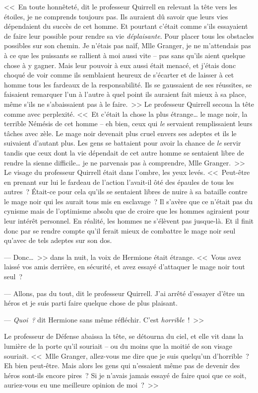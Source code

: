 <<~En toute honnêteté, dit le professeur Quirrell en relevant la tête vers les étoiles, je ne comprends toujours pas. Ils auraient dû savoir que leurs vies dépendaient du succès de cet homme. Et pourtant c'était comme s'ils essayaient de faire leur possible pour rendre sa vie \emph{déplaisante}. Pour placer tous les obstacles possibles sur son chemin. Je n'étais pas naïf, Mlle Granger, je ne m'attendais pas à ce que les puissants se rallient à moi aussi vite -- pas sans qu'ils aient quelque chose à y gagner. Mais leur pouvoir à eux aussi était menacé, et j'étais donc choqué de voir comme ils semblaient heureux de s'écarter et de laisser à cet homme tous les fardeaux de la responsabilité. Ils se gaussaient de ses réussites, se faisaient remarquer l'un à l'autre à quel point ils auraient fait mieux à sa place, même s'ils ne s'abaissaient pas à le faire.~>> Le professeur Quirrell secoua la tête comme avec perplexité. <<~Et c'était la chose la plus étrange… le mage noir, la terrible Némésis de cet homme -- eh bien, ceux qui \emph{le} servaient remplissaient leurs tâches avec zèle. Le mage noir devenait plus cruel envers ses adeptes et ils le suivaient d'autant plus. Les gens se battaient pour avoir la chance de \emph{le} servir tandis que ceux dont la vie dépendait de cet autre homme se sentaient libre de rendre la sienne difficile… je ne parvenais pas à comprendre, Mlle Granger.~>> Le visage du professeur Quirrell était dans l'ombre, les yeux levés. <<~Peut-être en prenant sur lui le fardeau de l'action l'avait-il ôté des épaules de tous les autres~? Était-ce pour cela qu'ils se sentaient libres de nuire à sa bataille contre le mage noir qui les aurait tous mis en esclavage~? Il s'avère que ce n'était pas du cynisme mais de l'optimisme absolu que de croire que les hommes agiraient pour leur intérêt personnel. En réalité, les hommes ne s'élèvent pas jusque-là. Et il finit donc par se rendre compte qu'il ferait mieux de combattre le mage noir seul qu'avec de tels adeptes sur son dos.

--- Donc…~>> dans la nuit, la voix de Hermione était étrange. <<~Vous avez laissé vos amis derrière, en sécurité, et avez essayé d'attaquer le mage noir tout seul~?

--- Allons, pas du tout, dit le professeur Quirrell. J'ai arrêté d'essayer d'être un héros et je suis parti faire quelque chose de plus plaisant.

--- \emph{Quoi~?} dit Hermione sans même réfléchir. C'est \emph{horrible}~!~>>

Le professeur de Défense abaissa la tête, se détourna du ciel, et elle vit dans la lumière de la porte qu'il souriait -- ou du moins que la moitié de son visage souriait. <<~Mlle Granger, allez-vous me dire que je suis quelqu'un d'horrible~? Eh bien peut-être. Mais alors les gens qui n'essaient même pas de devenir des héros sont-ils encore pires~? Si je n'avais jamais essayé de faire quoi que ce soit, auriez-vous eu une meilleure opinion de moi~?~>>

